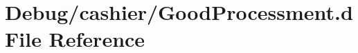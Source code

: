 \hypertarget{GoodProcessment_8d}{\section{Debug/cashier/\-Good\-Processment.d File Reference}
\label{GoodProcessment_8d}
}
